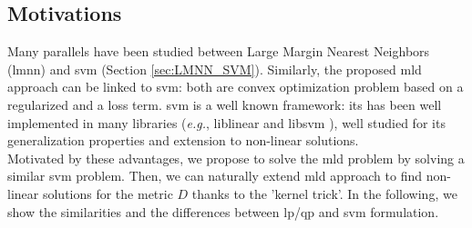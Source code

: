 \subsection{Motivations}

Many parallels have been studied between Large Margin Nearest Neighbors ({\sc lmnn}) and {\sc svm} (Section \ref{sec:LMNN_SVM}). Similarly, the proposed {\sc mld} approach can be linked to {\sc svm}: both are convex optimization problem based on a regularized and a loss term. {\sc svm} is a well known framework: its has been well implemented in many libraries (\textit{e.g.}, {\sc liblinear} \cite{Fan2008} and {\sc libsvm} \cite{Hsu2008}), well studied for its generalization properties and extension to non-linear solutions. \\
\indent Motivated by these advantages, we propose to solve the {\sc mld} problem by solving a similar {\sc svm} problem. Then, we can naturally extend {\sc mld} approach to find non-linear solutions for the metric $D$ thanks to the 'kernel trick'. 
In the following, we show the similarities and the differences between {\sc lp}/{\sc qp} and {\sc svm} formulation.

